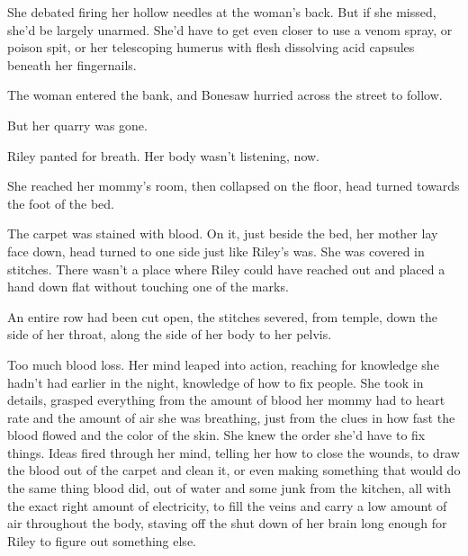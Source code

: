 She debated firing her hollow needles at the woman's back.  But if she missed, she'd be largely unarmed.  She'd have to get even closer to use a venom spray, or poison spit, or her telescoping humerus with flesh dissolving acid capsules beneath her fingernails.



The woman entered the bank, and Bonesaw hurried across the street to follow.



But her quarry was gone.



\blacksquare






Riley panted for breath.  Her body wasn't listening, now.



She reached her mommy's room, then collapsed on the floor, head turned towards the foot of the bed.



The carpet was stained with blood.  On it, just beside the bed, her mother lay face down, head turned to one side just like Riley's was.  She was covered in stitches.  There wasn't a place where Riley could have reached out and placed a hand down flat without touching one of the marks.



An entire row had been cut open, the stitches severed, from temple, down the side of her throat, along the side of her body to her pelvis.



Too much blood loss.  Her mind leaped into action, reaching for knowledge she hadn't had earlier in the night, knowledge of how to fix people.  She took in details, grasped everything from the amount of blood her mommy had to heart rate and the amount of air she was breathing, just from the clues in how fast the blood flowed and the color of the skin.  She knew the order she'd have to fix things.  Ideas fired through her mind, telling her how to close the wounds, to draw the blood out of the carpet and clean it, or even making something that would do the same thing blood did, out of water and some junk from the kitchen, all with the exact right amount of electricity, to fill the veins and carry a low amount of air throughout the body, staving off the shut down of her brain long enough for Riley to figure out something else.



